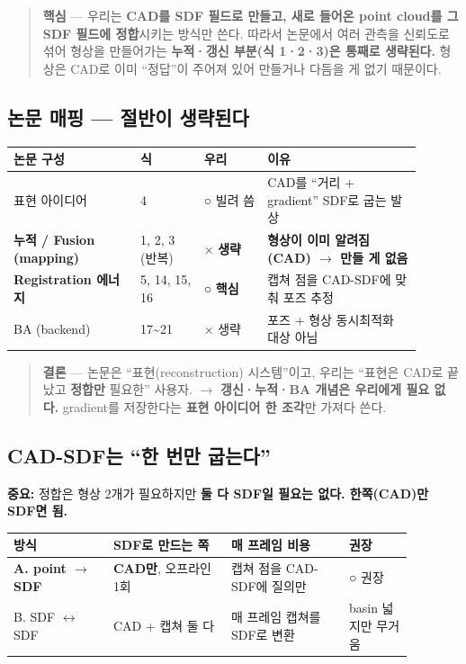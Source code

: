 \begin{quote}
  \small\textbf{핵심} --- 우리는 \textbf{CAD를 SDF 필드로 만들고, 새로 들어온
  point cloud를 그 SDF 필드에 정합}시키는 방식만 쓴다. 따라서 논문에서 여러
  관측을 신뢰도로 섞어 형상을 만들어가는 \textbf{누적·갱신 부분(식 1·2·3)은
  통째로 생략된다.} 형상은 CAD로 이미 ``정답''이 주어져 있어 만들거나 다듬을
  게 없기 때문이다.
\end{quote}

\subsection{논문 매핑 --- 절반이 생략된다}

\begin{longtable}{p{0.28\linewidth}p{0.14\linewidth}p{0.14\linewidth}p{0.34\linewidth}}
\toprule
\textbf{논문 구성} & \textbf{식} & \textbf{우리} & \textbf{이유} \\
\midrule
표현 아이디어 & 4 & ○ 빌려 씀 & CAD를 ``거리 + gradient'' SDF로 굽는 발상 \\
\textbf{누적 / Fusion (mapping)} & 1, 2, 3 (반복) & × \textbf{생략} &
  \textbf{형상이 이미 알려짐(CAD) $\to$ 만들 게 없음} \\
\textbf{Registration 에너지} & 5, 14, 15, 16 & ○ \textbf{핵심} &
  캡쳐 점을 CAD-SDF에 맞춰 포즈 추정 \\
BA (backend) & 17\textasciitilde 21 & × 생략 & 포즈 + 형상 동시최적화 대상
  아님 \\
\bottomrule
\end{longtable}

\begin{quote}
  \small\textbf{결론} --- 논문은 ``표현(reconstruction) 시스템''이고, 우리는
  ``표현은 CAD로 끝났고 \textbf{정합만} 필요한'' 사용자. $\to$ \textbf{갱신·누적·BA
  개념은 우리에게 필요 없다.} gradient를 저장한다는 \textbf{표현 아이디어 한
  조각}만 가져다 쓴다.
\end{quote}

\subsection{CAD-SDF는 ``한 번만 굽는다''}

\textbf{중요:} 정합은 형상 2개가 필요하지만 \textbf{둘 다 SDF일 필요는 없다.
한쪽(CAD)만 SDF면 됨.}

\begin{longtable}{p{0.22\linewidth}p{0.26\linewidth}p{0.26\linewidth}p{0.14\linewidth}}
\toprule
\textbf{방식} & \textbf{SDF로 만드는 쪽} & \textbf{매 프레임 비용} &
\textbf{권장} \\
\midrule
\textbf{A. point $\to$ SDF} & \textbf{CAD만}, 오프라인 1회 &
  캡쳐 점을 CAD-SDF에 질의만 & ○ 권장 \\
B. SDF $\leftrightarrow$ SDF & CAD + 캡쳐 둘 다 &
  매 프레임 캡쳐를 SDF로 변환 & basin 넓지만 무거움 \\
\bottomrule
\end{longtable}

